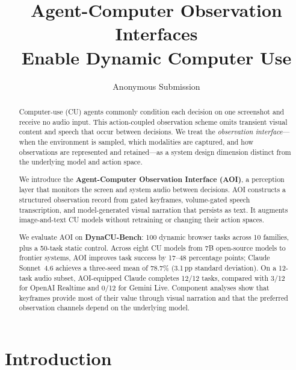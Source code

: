 \documentclass[letterpaper]{article} %
\title{Agent-Computer Observation Interfaces\\Enable Dynamic Computer Use}
\author{
    Anonymous Submission
}
\begin{document}
\maketitle

\begin{abstract}
Computer-use (CU) agents commonly condition each decision on one screenshot and
receive no audio input. This action-coupled observation scheme omits transient
visual content and speech that occur between decisions. We treat the
\emph{observation interface}---when the environment is sampled, which
modalities are captured, and how observations are represented and retained---as
a system design dimension distinct from the underlying model and action space.

We introduce the \textbf{Agent-Computer Observation Interface (AOI)}, a
perception layer that monitors the screen and system audio between decisions.
AOI constructs a structured observation record from gated keyframes,
volume-gated speech transcription, and model-generated visual narration that
persists as text. It augments image-and-text CU models without retraining or
changing their action spaces.

We evaluate AOI on \textbf{DynaCU-Bench}: 100 dynamic browser tasks across 10
families, plus a 50-task static control. Across eight CU models from 7B
open-source models to frontier systems, AOI improves task success by 17--48
percentage points; Claude Sonnet~4.6 achieves a three-seed mean of 78.7\%
(3.1\,pp standard deviation). On a 12-task audio subset, AOI-equipped Claude
completes 12/12 tasks, compared with 3/12 for OpenAI Realtime and 0/12 for Gemini Live.
Component analyses show that keyframes provide most of their value through
visual narration and that the preferred observation channels depend on the
underlying model.
\end{abstract}


\section{Introduction}
\label{sec:intro}
\end{document}
